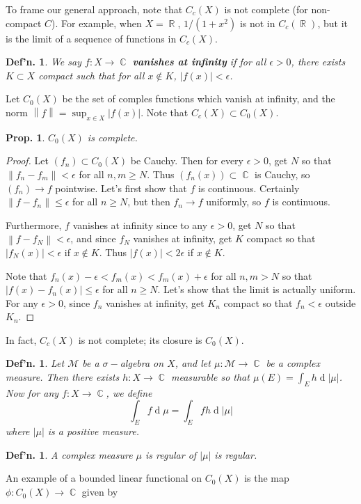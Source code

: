 \documentclass[12pt, a4paper]{book}
\DeclareMathOperator{\R}{\mathbb{R}}
\DeclareMathOperator{\C}{\mathbb{C}}
\renewcommand{\d}[1]{\ensuremath{\operatorname{d}\!{#1}}} %
\newcommand{\norm}[1]{\left\lVert#1\right\rVert} %
\newtheorem{definition}[theorem]{Def'n.}
\newtheorem{proposition}[theorem]{Prop.}
\theoremstyle{nonumberplain}
\newtheorem{proof}{Proof}
\begin{document}
To frame our general approach, note that $C_c(X)$ is not complete (for non-compact $C$).
For example, when $X=\R$, $1/(1+x^2)$ is not in $C_c(\R)$, but it is the limit of a sequence of functions in $C_c(X)$.
\begin{definition}
    We say $f:X\to\C$ \textbf{vanishes at infinity} if for all $\epsilon>0$, there exists $K\subset X$ compact such that for all $x\notin K$, $|f(x)|<\epsilon$.
\end{definition}
Let $C_0(X)$ be the set of comples functions which vanish at infinity, and the norm $\norm{f}=\sup_{x\in X}|f(x)|$.
Note that $C_c(X)\subset C_0(X)$.
\begin{proposition}
    $C_0(X)$ is complete.
\end{proposition}
\begin{proof}
    Let $(f_n)\subset C_0(X)$ be Cauchy.
    Then for every $\epsilon>0$, get $N$ so that $\norm{f_n-f_m}<\epsilon$ for all $n,m\geq N$.
    Thus $(f_n(x))\subset\C$ is Cauchy, so $(f_n)\to f$ pointwise.
    Let's first show that $f$ is continuous.
    Certainly $\norm{f-f_n}\leq\epsilon$ for all $n\geq N$, but then $f_n\to f$ uniformly, so $f$ is continuous.

    Furthermore, $f$ vanishes at infinity since to any $\epsilon>0$, get $N$ so that $\norm{f-f_N}<\epsilon$, and since $f_N$ vanishes at infinity, get $K$ compact so that $|f_N(x)|<\epsilon$ if $x\notin K$.
    Thus $|f(x)|<2\epsilon$ if $x\notin K$.

    Note that $f_n(x)-\epsilon<f_m(x)<f_m(x)+\epsilon$ for all $n,m>N$ so that $|f(x)-f_n(x)|\leq\epsilon$ for all $n\geq N$.
    Let's show that the limit is actually uniform.
    For any $\epsilon>0$, since $f_n$ vanishes at infinity, get $K_n$ compact so that $f_n<\epsilon$ outside $K_n$.
\end{proof}
In fact, $C_c(X)$ is not complete; its closure is $C_0(X)$.
\begin{definition}
    Let $\mathcal{M}$ be a $\sigma-$algebra on $X$, and let $\mu:\mathcal{M}\to\C$ be a complex measure.
    Then there exists $h:X\to\C$ measurable so that $\mu(E)=\int_E h\d{|\mu|}$.
    Now for any $f:X\to\C$, we define
    \[\int_E f\d{\mu}=\int_E fh\d{|\mu|}\]
    where $|\mu|$ is a positive measure.
\end{definition}
\begin{definition}
    A complex measure $\mu$ is regular of $|\mu|$ is regular.
\end{definition}
An example of a bounded linear functional on $C_0(X)$ is the map $\phi:C_0(X)\to\C$ given by
\end{document}
